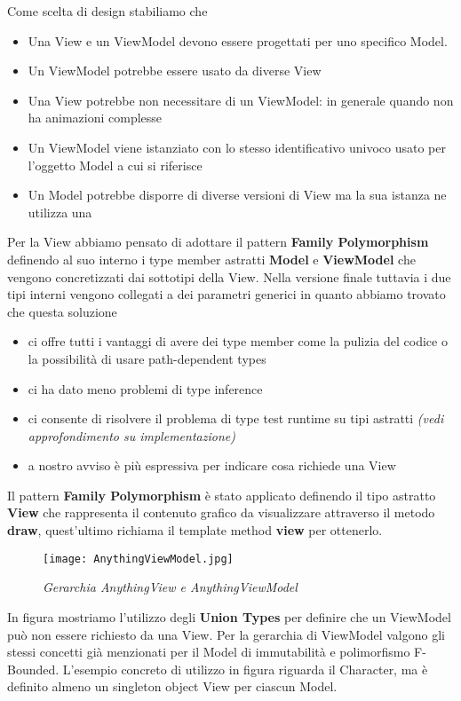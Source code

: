 Come scelta di design stabiliamo che 
\begin{itemize}
    \item Una View e un ViewModel devono essere progettati per uno specifico Model.
    \item Un ViewModel potrebbe essere usato da diverse View
    \item Una View potrebbe non necessitare di un ViewModel: in generale quando non ha animazioni complesse
    \item Un ViewModel viene istanziato con lo stesso identificativo univoco usato per l'oggetto Model a cui si riferisce
    \item Un Model potrebbe disporre di diverse versioni di View ma la sua istanza ne utilizza una
\end{itemize}
Per la View abbiamo pensato di adottare il pattern \textbf{Family Polymorphism} definendo al suo interno i type member astratti \textbf{Model} e \textbf{ViewModel} che vengono concretizzati dai sottotipi della View.
Nella versione finale tuttavia i due tipi interni vengono collegati a dei parametri generici in quanto abbiamo trovato che questa soluzione
\begin{itemize}
    \item ci offre tutti i vantaggi di avere dei type member come la pulizia del codice o la possibilità di usare path-dependent types
    \item ci ha dato meno problemi di type inference 
    \item ci consente di risolvere il problema di type test runtime su tipi astratti \textit{(vedi approfondimento su implementazione)}
    \item a nostro avviso è più espressiva per indicare cosa richiede una View
\end{itemize}

Il pattern \textbf{Family Polymorphism} è stato applicato definendo il tipo astratto \textbf{View} che rappresenta il contenuto grafico da visualizzare attraverso il metodo \textbf{draw}, quest'ultimo richiama il template method \textbf{view} per ottenerlo.

\begin{figure}[!hbt]
    \centering
    \texttt{[image: AnythingViewModel.jpg]}
    \caption{\textit{Gerarchia AnythingView e AnythingViewModel}} 
\end{figure}

In figura mostriamo l'utilizzo degli \textbf{Union Types} per definire che un ViewModel può non essere richiesto da una View.
Per la gerarchia di ViewModel valgono gli stessi concetti già menzionati per il Model di immutabilità e polimorfismo F-Bounded.
L'esempio concreto di utilizzo in figura riguarda il Character, ma è definito almeno un singleton object View per ciascun Model.

